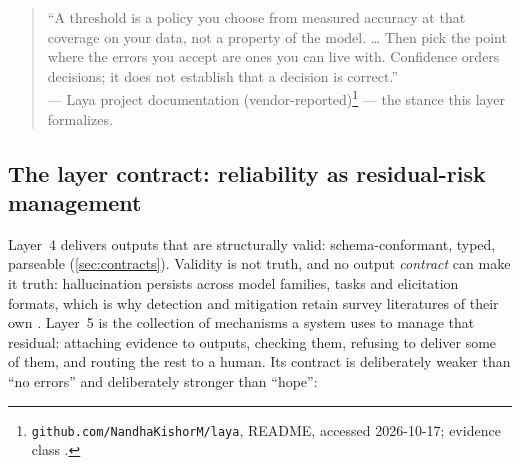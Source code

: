 
\begin{quote}
``A threshold is a policy you choose from measured accuracy at that coverage on your data, not a
property of the model. \dots{} Then pick the point where the errors you accept are ones you can
live with. Confidence orders decisions; it does not establish that a decision is correct.''
\\[-0.3em]
{\small --- Laya project documentation (vendor-reported)\footnote{\texttt{github.com/NandhaKishorM/laya},
README, accessed 2026-10-17; evidence class \evvendor{}.} --- the stance this layer formalizes.}
\end{quote}

\subsection{The layer contract: reliability as residual-risk management}
\label{sec:l5-contract}

Layer~4 delivers outputs that are structurally valid: schema-conformant, typed, parseable
(\cref{sec:contracts}). Validity is not truth, and no output \emph{contract} can make it truth:
hallucination persists across model families, tasks and elicitation formats, which is why
detection and mitigation retain survey literatures of their own
\cite{id230901219,id251006265} \evsynth{}. Layer~5 is the collection of mechanisms a
system uses to manage that residual: attaching evidence to outputs, checking them, refusing
to deliver some of them, and routing the rest to a human. Its contract is deliberately weaker
than ``no errors'' and deliberately stronger than ``hope'':

